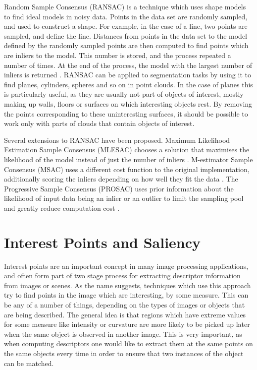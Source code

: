\documentclass[11pt,a4paper]{kth-mag}
\begin{document}
Random Sample Consensus (RANSAC) is a technique which uses shape models to find
ideal models in noisy data. Points in the data set are randomly sampled, and
used to construct a shape. For example, in the case of a line, two points are
sampled, and define the line. Distances from points in the data set to the model
defined by the randomly sampled points are then computed to find points which
are inliers to the model. This number is stored, and the process repeated a
number of times. At the end of the process, the model with the largest number of
inliers is returned \cite{fischler1981random}. RANSAC can be applied to
segmentation tasks by using it to find planes, cylinders, spheres and so on in
point clouds. In the case of planes this is particularly useful, as they are
usually not part of objects of interest, mostly making up walls, floors or
surfaces on which interesting objects rest. By removing the points corresponding
to these uninteresting surfaces, it should be possible to work only with parts
of clouds that contain objects of interest.

Several extensions to RANSAC have been proposed. Maximum Likelihood Estimation
Sample Consensus (MLESAC) chooses a solution that maximises the likelihood of
the model instead of just the number of inliers \cite{torr2000mlesac}.
M-estimator Sample Consensus (MSAC) uses a different cost function to the
original implementation, additionally scoring the inliers depending on how well
they fit the data \cite{torr2000mlesac}. The Progressive Sample Consensus
(PROSAC) uses prior information about the likelihood of input data being an
inlier or an outlier to limit the sampling pool and greatly reduce computation
cost \cite{chum2005matching}.


\section{Interest Points and Saliency}
Interest points are an important concept in many image processing applications,
and often form part of two stage process for extracting descriptor information
from images or scenes. As the name suggests, techniques which use this approach
try to find points in the image which are interesting, by some measure. This can
be any of a number of things, depending on the types of images or objects that
are being described. The general idea is that regions which have extreme values
for some measure like intensity or curvature are more likely to be picked up
later when the same object is observed in another image. This is very important,
as when computing descriptors one would like to extract them at the same points
on the same objects every time in order to ensure that two instances of the
object can be matched.
\end{document}
